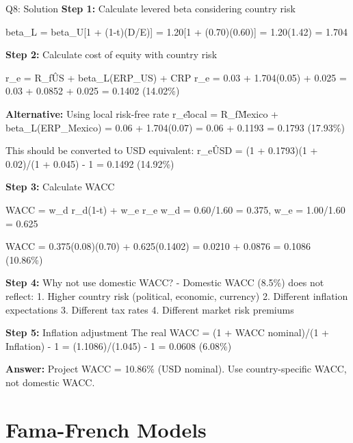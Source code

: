 \documentclass{beamer}
\renewcommand{\scriptsize}{\fontsize{6pt}{7pt}\selectfont}
\begin{document}
	\begin{frame}{Q8: Solution}
		\scriptsize
		\textbf{Step 1:} Calculate levered beta considering country risk
		
		beta\_L = beta\_U[1 + (1-t)(D/E)] = 1.20[1 + (0.70)(0.60)] = 1.20(1.42) = 1.704
		
		\textbf{Step 2:} Calculate cost of equity with country risk
		
		r\_e = R\_f\^{US} + beta\_L(ERP\_US) + CRP
		r\_e = 0.03 + 1.704(0.05) + 0.025 = 0.03 + 0.0852 + 0.025 = 0.1402 (14.02\%)
		
		\textbf{Alternative:} Using local risk-free rate
		r\_e\^{local} = R\_f\^{Mexico} + beta\_L(ERP\_Mexico) = 0.06 + 1.704(0.07) = 0.06 + 0.1193 = 0.1793 (17.93\%)
		
		This should be converted to USD equivalent: r\_e\^{USD} = (1 + 0.1793)(1 + 0.02)/(1 + 0.045) - 1 = 0.1492 (14.92\%)
		
		\textbf{Step 3:} Calculate WACC
		
		WACC = w\_d r\_d(1-t) + w\_e r\_e
		w\_d = 0.60/1.60 = 0.375, w\_e = 1.00/1.60 = 0.625
		
		WACC = 0.375(0.08)(0.70) + 0.625(0.1402) = 0.0210 + 0.0876 = 0.1086 (10.86\%)
		
		\textbf{Step 4:} Why not use domestic WACC?
		- Domestic WACC (8.5\%) does not reflect:
		1. Higher country risk (political, economic, currency)
		2. Different inflation expectations
		3. Different tax rates
		4. Different market risk premiums
		
		\textbf{Step 5:} Inflation adjustment
		The real WACC = (1 + WACC nominal)/(1 + Inflation) - 1
		= (1.1086)/(1.045) - 1 = 0.0608 (6.08\%)
		
		\textbf{Answer:} Project WACC = 10.86\% (USD nominal). Use country-specific WACC, not domestic WACC.
	\end{frame}
	
	
	\section{Fama-French Models}
	
\end{document}
